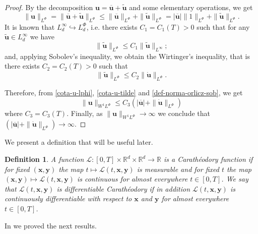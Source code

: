 \documentclass[twoside]{article}
\newtheorem{defi}[thm]{Definition}
\theoremstyle{remark}
\newcommand{\orlnor}{\|_{L^{\Phi}}}
\newcommand{\lphi}{L^{\Phi}}
\newcommand{\sobnor}{\|_{W^{1}\lphi}}
\renewcommand{\b}[1]{\boldsymbol{#1}}
\renewcommand{\leq}{\leqslant}
\begin{document}
\begin{proof}
By the decomposition $\b{u}=\b{\overline u}+\b{\tilde{u}}$ and some elementary operations, 
we get
\begin{equation}\label{cota-u-lphi}
\|\b{u}\orlnor=
\|\b{\overline u}+\b{\tilde{u}}\orlnor\leq 
\|\b{\overline u}\orlnor+\|\b{\tilde{u}}\orlnor=
|\b{\overline u}|\|1\orlnor+\|\b{\tilde{u}}\orlnor.
\end{equation}
It is known that $L^{\infty}_d\hookrightarrow\lphi_d$, i.e.
there exists $C_1=C_1(T)>0$ such that for any $\b{\tilde{u}}\in L^{\infty}_d$ we have
\[
\|\b{\tilde{u}}\orlnor
\leq 
C_1 \|\b{\tilde{u}}\|_{L^{\infty}};
\]
and, applying  Sobolev's inequality,  we obtain the Wirtinger's inequality, that is there exists $C_2=C_2(T)>0$ such that 
\begin{equation}\label{cota-u-tilde}
\|\b{\tilde{u}}\orlnor
\leq 
C_2\|\b{\dot{u}}\orlnor.
\end{equation}

Therefore, from \eqref{cota-u-lphi}, \eqref{cota-u-tilde} and \eqref{def-norma-orlicz-sob}, 
we get
\[
\|\b{u}\sobnor\leq
C_3(|\b{\overline u}|+\|\b{\dot{u}}\orlnor)
\]
where $C_3=C_3(T)$. Finally, as $\|\b{u}\sobnor\to \infty$ we conclude that   
$(|\b{\overline u}|+\|\b{\dot{u}}\orlnor)\to \infty$.
\end{proof}


We present a definition that will be useful later.
 
\begin{defi} A function $\mathcal{L}:[0,T]\times \mathbb{R}^d \times \mathbb{R}^d \rightarrow \mathbb{R}$ is a \emph{Carath\'eodory} function if for fixed $(\b{x},\b{y})$
the map $t \mapsto \mathcal{L}(t, \b{x},\b{y})$ is measurable  and for fixed $t$ the map  $(\b{x},\b{y}) \mapsto \mathcal{L}(t, \b{x}, \b{y})$ is continuous  for almost everywhere $t\in [0,T]$. We say that 
$\mathcal{L}(t, \b{x},\b{y})$ is  \emph{differentiable Carath\'eodory} if in addition $\mathcal{L}(t, \b{x},\b{y})$ is
continuously differentiable with respect to $\b{x}$ and $\b{y}$  for almost everywhere $t\in [0,T]$.

\end{defi}


In \cite{ABGMS2015} we proved the next results.
\end{document}
